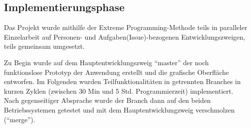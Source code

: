 \documentclass[	a4paper,		%
		titlepage, 		%
		fontsize=12pt		%
		]{scrartcl} 		%
\begin{document}
\subsection{Implementierungsphase}
Das Projekt wurde mithilfe der Extreme Programming-Methode teils in paralleler Einzelarbeit auf Personen- und Aufgaben(Issue)-bezogenen Entwicklungszweigen, teils gemeinsam umgesetzt.

Zu Begin wurde auf dem Hauptentwicklungszweig ``master'' der noch funktionslose Prototyp der Anwendung erstellt und die grafische Oberfläche entworfen. Im Folgenden wurden Teilfunktionalitäten in getrennten Branches in kurzen Zyklen (zwischen 30 Min und 5 Std. Programmierzeit) implementiert. Nach gegenseitiger Absprache wurde der Branch dann auf den beiden Betriebssystemen getestet und mit dem Hauptentwicklungzweig verschmolzen (``merge'').
\end{document}
